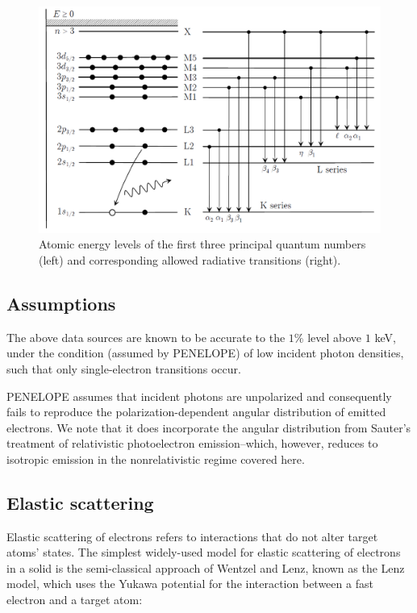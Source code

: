 \documentclass [11pt, proquest, article] {uwthesis}[2016/11/22]
\begin{document}
\begin{figure}[h] 
\caption{Atomic energy levels of the first three principal quantum numbers (left) and corresponding allowed radiative transitions (right). \cite{salvat2008penelope}}
\label{fig:photoionization}
\centering
\includegraphics[scale=0.4]{../Figures/penelope_2_2.png}
\end{figure}



\subsection{Assumptions}
The above data sources are known to be accurate to the $1\%$ level above $1$ keV, under the condition (assumed by PENELOPE) of low incident photon densities, such that only single-electron transitions occur.\cite{salvat2008penelope}

PENELOPE assumes that incident photons are unpolarized and consequently fails to reproduce the polarization-dependent angular distribution of emitted electrons. 
We note that it does incorporate the angular distribution from Sauter's treatment of relativistic photoelectron emission--which, however, reduces to isotropic emission in the nonrelativistic regime covered here.\cite{sauter1931atomaren}



\subsection{Elastic scattering}
Elastic scattering of electrons refers to interactions that do not alter target atoms' states. 
The simplest widely-used model for elastic scattering of electrons in a solid is the semi-classical approach of Wentzel and Lenz, known as the Lenz model, which uses the Yukawa potential for the interaction between a fast electron and a target atom:
\end{document}
